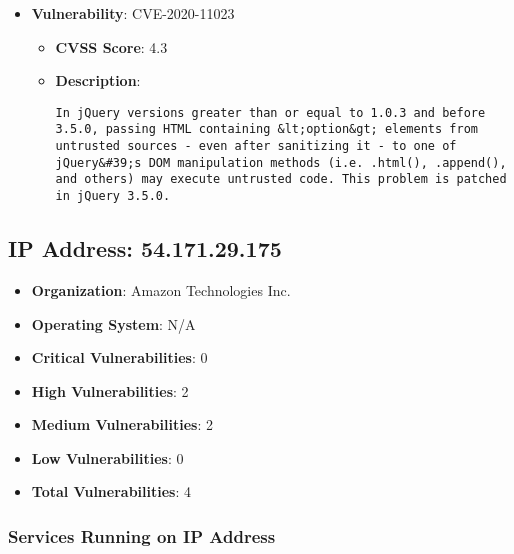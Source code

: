 \documentclass{article}
\begin{document}
\begin{itemize}
        \item \textbf{Vulnerability}: CVE-2020-11023
        \begin{itemize}
            \item \textbf{CVSS Score}:  4.3 
            \item \textbf{Description}:
            \parbox[t]{0.9\linewidth}{
                \verb|In jQuery versions greater than or equal to 1.0.3 and before 3.5.0, passing HTML containing &lt;option&gt; elements from untrusted sources - even after sanitizing it - to one of jQuery&#39;s DOM manipulation methods (i.e. .html(), .append(), and others) may execute untrusted code. This problem is patched in jQuery 3.5.0.|
            }
        \end{itemize}
    
\end{itemize}




\clearpage



\subsection*{IP Address: 54.171.29.175}

\begin{itemize}
    \item \textbf{Organization}: Amazon Technologies Inc.
    \item \textbf{Operating System}:  N/A 
    \item \textbf{Critical Vulnerabilities}: 0
    \item \textbf{High Vulnerabilities}: 2
    \item \textbf{Medium Vulnerabilities}: 2
    \item \textbf{Low Vulnerabilities}: 0
    \item \textbf{Total Vulnerabilities}: 4
\end{itemize}

\subsubsection*{Services Running on IP Address}
\end{document}
